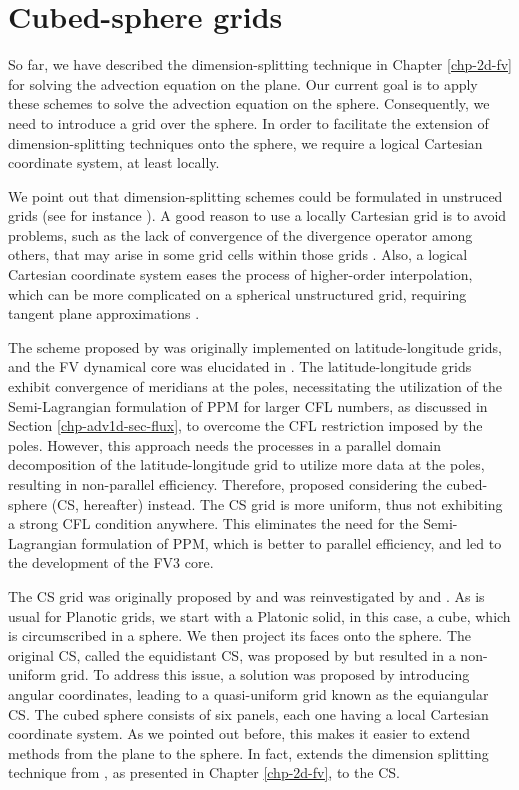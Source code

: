 \chapter{Cubed-sphere grids}
\label{chp-cs-grids}
So far, we have described the dimension-splitting technique in Chapter \ref{chp-2d-fv} for solving the advection equation on the plane.
Our current goal is to apply these schemes to solve the advection equation on the sphere.
Consequently, we need to introduce a grid over the sphere.
In order to facilitate the extension of dimension-splitting techniques onto the sphere, we require a logical Cartesian coordinate system, at least locally.

We point out that dimension-splitting schemes could be formulated in unstruced grids (see for instance \citet{herzfeld:2023}).
A good reason to use a locally Cartesian grid is to avoid problems, such as the lack of convergence of the divergence operator among others,
that may arise in some grid cells within those grids \citep{peixoto:2013, peixoto:2016, weller:2012}.
Also, a logical Cartesian coordinate system eases the process of higher-order interpolation,
which can be more complicated on a spherical unstructured grid, requiring tangent plane approximations \citep{peixoto:2014,skamarock:2011}.

The scheme proposed by \citet{lin:1996} was originally implemented on latitude-longitude grids,
and the FV dynamical core was elucidated in \citet{lin:2004}.
The latitude-longitude grids exhibit convergence of meridians at the poles, 
necessitating the utilization of the Semi-Lagrangian formulation of PPM for larger CFL numbers,
as discussed in Section \ref{chp-adv1d-sec-flux}, 
to overcome the CFL restriction imposed by the poles.
However, this approach needs the processes in a parallel domain decomposition of the latitude-longitude grid to utilize more
data at the poles, resulting in non-parallel efficiency.
Therefore, \citet{putman:2007} proposed considering the cubed-sphere (CS, hereafter) instead.
The CS grid is more uniform, thus not exhibiting a strong CFL condition anywhere.
This eliminates the need for the Semi-Lagrangian formulation of PPM, which is better to parallel efficiency, and led to the development of the FV3 core.

The CS grid was originally proposed by \citet{sadourny:1972} and was 
reinvestigated by \citet{ronchi:1996} and \citet{rancic:1996}. 
As is usual for Planotic grids, we start with a Platonic solid, in this case, a cube, 
which is circumscribed in a sphere. We then project its faces onto the sphere.
The original CS, called the equidistant CS, was proposed by 
\citet{sadourny:1972} but resulted in a non-uniform grid. 
To address this issue, a solution was proposed by introducing angular coordinates, 
leading to a quasi-uniform grid known as the equiangular CS.
The cubed sphere consists of six panels, each one having a local Cartesian coordinate 
system. 
As we pointed out before, this makes it easier to extend methods from the plane to the sphere. 
In fact, \citet{putman:2007} extends the dimension splitting technique from 
\citet{lin:1996}, as presented in Chapter \ref{chp-2d-fv}, to the CS.


